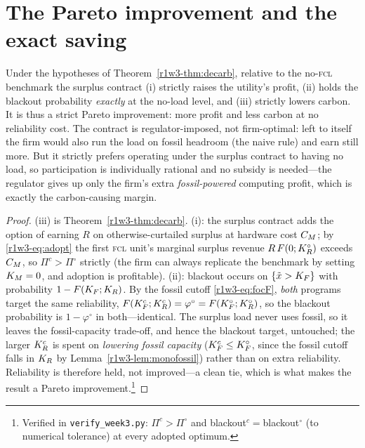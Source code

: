 \section{The Pareto improvement and the exact saving}\label{r1w3-sec:triplewin}

\begin{corollary}\label{r1w3-cor:triplewin}
Under the hypotheses of Theorem~\ref{r1w3-thm:decarb}, relative to the no-\textsc{fcl}
benchmark the surplus contract \textup{(i)} strictly raises the utility's profit,
\textup{(ii)} holds the blackout probability \emph{exactly} at the no-load level, and
\textup{(iii)} strictly lowers carbon. It is thus a strict Pareto
improvement: more profit and less carbon at no reliability cost. The contract is
regulator-imposed, not firm-optimal: left to itself the firm would also run the load on
fossil headroom (the naive rule) and earn still more. But it strictly prefers operating
under the surplus contract to having no load, so participation is individually rational
and no subsidy is needed---the regulator gives up only the firm's extra
\emph{fossil-powered} computing profit, which is exactly the carbon-causing margin.
\end{corollary}

\begin{proof}
(iii) is Theorem~\ref{r1w3-thm:decarb}. (i): the surplus contract adds the option of
earning $R$ on otherwise-curtailed surplus at hardware cost $C_M$; by \eqref{r1w3-eq:adopt}
the first \textsc{fcl} unit's marginal surplus revenue $R\,F(0;K_R^{\circ})$ exceeds $C_M$, so
$\Pi^{c}>\Pi^{\circ}$ strictly (the firm can always replicate the benchmark by setting
$K_M=0$, and adoption is profitable). (ii): blackout occurs on $\{\tilde x>K_F\}$ with
probability $1-F(K_F;K_R)$. By the fossil cutoff \eqref{r1w3-eq:focF}, \emph{both} programs
target the same reliability, $F(K_F^{c};K_R^{c})=\varphi^{\circ}=F(K_F^{\circ};K_R^{\circ})$, so the
blackout probability is $1-\varphi^{\circ}$ in both---identical. The surplus load never
uses fossil, so it leaves the fossil-capacity trade-off, and hence the blackout target,
untouched; the larger $K_R^{c}$ is spent on \emph{lowering fossil capacity}
($K_F^{c}\le K_F^{\circ}$, since the fossil cutoff falls in $K_R$ by Lemma~\ref{r1w3-lem:monofossil})
rather than on extra reliability. Reliability is therefore held,
not improved---a clean tie, which is what makes the result a Pareto
improvement.\footnote{Verified in \texttt{verify\_week3.py}: $\Pi^{c}>\Pi^{\circ}$ and
blackout$^{c}=$blackout$^{\circ}$ (to numerical tolerance) at every adopted optimum.}
\end{proof}

